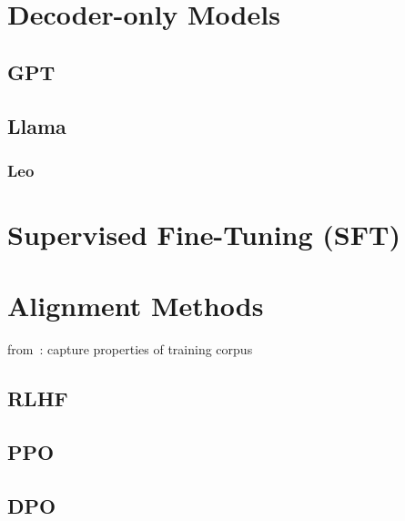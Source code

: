 \section{Decoder-only Models}\label{sec:decoder}

\subsection{GPT}\label{subsec:gpt}

\subsection{Llama}\label{subsec:llama}

\subsubsection{Leo}


\section{Supervised Fine-Tuning (SFT)}\label{sec:supervised-fine-tuning}


\section{Alignment Methods}\label{sec:alignment-methods}
from~\autocite{zhao2023survey}:
capture properties of training corpus

\subsection{RLHF}\label{subsec:rlhf}

\subsection{PPO}\label{subsec:ppo}

\subsection{DPO}\label{subsec:dpo}
